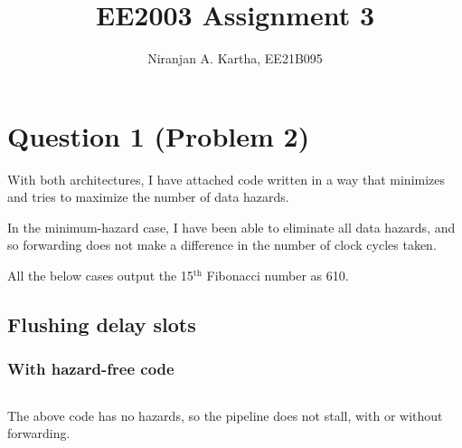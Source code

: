 \documentclass[11pt]{article}
\title{EE2003 Assignment 3 \vspace{-1em}}
\author{Niranjan A. Kartha, EE21B095\vspace{-3em}}
\date{}
\newenvironment{codeblock}{\captionsetup{type=codelisting}}{}
\begin{document}
\maketitle
\section{Question 1 (Problem 2)}
With both architectures, I have attached code written in a way that minimizes and tries to maximize the number of data hazards.

In the minimum-hazard case, I have been able to eliminate all data hazards, and so forwarding does not make a difference in the number of clock cycles taken.

All the below cases output the 15$^{\text{th}}$ Fibonacci number as 610.

\subsection{Flushing delay slots}
\subsubsection{With hazard-free code}
\begin{codeblock}
\inputminted[breaklines,
 mathescape,
 linenos,
 numbersep=5pt,
 frame=single,
 xleftmargin=0pt]{asm}{q1/fib-nobdex.S}
\end{codeblock}

The above code has no hazards, so the pipeline does not stall, with or without forwarding.
\end{document}
